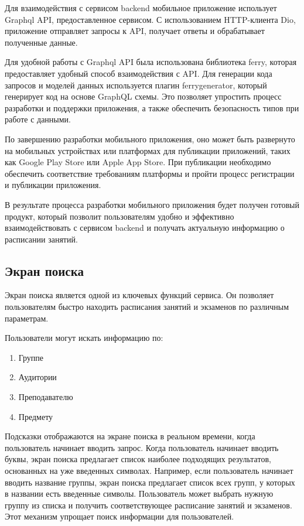Для взаимодействия с сервисом backend мобильное приложение использует Graphql API,
предоставленное сервисом. С использованием HTTP-клиента Dio, приложение отправляет запросы к API,
получает ответы и обрабатывает полученные данные.

Для удобной работы с Graphql API была использована библиотека ferry, которая предоставляет удобный способ взаимодействия с API.
Для генерации кода запросов и моделей данных используется плагин ferry\textunderscore generator, который генерирует код на основе GraphQL схемы.
Это позволяет упростить процесс разработки и поддержки приложения, а также обеспечить безопасность типов при работе с данными.

По завершению разработки мобильного приложения, оно может быть развернуто на мобильных устройствах или платформах для публикации приложений, 
таких как Google Play Store или Apple App Store. При публикации необходимо обеспечить 
соответствие требованиям платформы и пройти процесс регистрации и публикации приложения.

В результате процесса разработки мобильного приложения будет получен готовый продукт, 
который позволит пользователям удобно и эффективно взаимодействовать с сервисом backend 
и получать актуальную информацию о расписании занятий.

\subsection{Экран поиска}
Экран поиска является одной из ключевых функций сервиса.
Он позволяет пользователям быстро находить расписания занятий и экзаменов по различным параметрам.

Пользователи могут искать информацию по:
\begin{enumerate}
    \item Группе
    \item Аудитории
    \item Преподавателю
    \item Предмету
\end{enumerate}

Подсказки отображаются на экране поиска в реальном времени, когда пользователь начинает вводить запрос.
Когда пользователь начинает вводить буквы, экран поиска предлагает список наиболее подходящих результатов,
основанных на уже введенных символах.
Например, если пользователь начинает вводить название группы,
экран поиска предлагает список всех групп, у которых в названии есть введенные символы.
Пользователь может выбрать нужную группу из списка и получить соответствующее расписание занятий и экзаменов.
Этот механизм упрощает поиск информации для пользователей.

